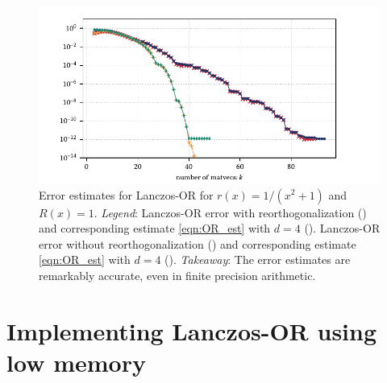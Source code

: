 \begin{figure}[htb]
    \begin{center}
        \includegraphics{imgs/ch5_OR_error_est.pdf} 
    \end{center}
    \caption[{Error estimates for Lanczos-OR for \( r(x) = 1/(x^2+1) \) and \( R(x) = 1 \).}]{%
    Error estimates for Lanczos-OR for \( r(x) = 1/(x^2+1) \) and \( R(x) = 1 \).
    \hspace{.25em}\emph{Legend}:
    Lanczos-OR error with reorthogonalization 
    ({\protect{}}) 
    and corresponding estimate \cref{eqn:OR_est} with \( d=4 \)
    ({\protect{}}).
    Lanczos-OR error without reorthogonalization 
    ({\protect{}}) 
    and corresponding estimate \cref{eqn:OR_est} with \( d=4 \)
    ({\protect{}}).
    \hspace{.25em}\emph{Takeaway}: The error estimates are remarkably accurate, even in finite precision arithmetic. 
    }
    \label{fig:ch5_OR_error_est}
\end{figure}



\section{Implementing Lanczos-OR using low memory}
\label{sec:low_mem}


